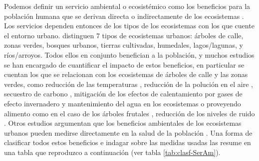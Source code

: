 \documentclass[12pt,]{book}
\begin{document}
Podemos definir un servicio ambiental o ecosistémico como los beneficios
para la población humana que se derivan directa o indirectamente de los
ecosistemas \citep{bolund_ecosystem_1999}. Los servicios dependen
entonces de los tipos de los ecosistemas con los que cuente el entorno
urbano. \citet{bolund_ecosystem_1999} distinguen 7 tipos de ecosistemas
urbanos: árboles de calle, zonas verdes, bosques urbanos, tierras
cultivadas, humedales, lagos/lagunas, y ríos/arroyos. Todos ellos en
conjunto benefician a la población, y muchos estudios se han encargado
de cuantificar el impacto de estos beneficios, en particular se cuentan
los que se relacionan con los ecosistemas de árboles de calle y las
zonas verdes, como reducción de las temperaturas
\citep{ripoll_condiciones_2010}, reducción de la polución en el aire
\citep{duran_rivera_intercepcion_2009}, secuestro de carbono
\citep{nowak_carbon_2002, mcpherson2013new} , mitigación de los efectos
de calentamiento por gases de efecto invernadero
\citep{laredo_gestion_2011} y mantenimiento del agua en los ecosistemas
o proveyendo alimento como en el caso de los árboles frutales
\citep{konijnendijk_arboles_2005, nolazco_diversidad_2012}, reducción de
los niveles de ruido \citep{bolund_ecosystem_1999}. Otros estudios
argumentan que los beneficios ambientales de los ecosistemas urbanos
pueden medirse directamente en la salud de la población
\citep{bolund_ecosystem_1999, gomez-baggethun_classifying_2013}. Una
forma de clasificar todos estos beneficios e indagar sobre las medidas
usadas las resume \citet{gomez-baggethun_classifying_2013} en una tabla
que reproduzco a continuación (ver tabla \ref{tab:clasf-SerAm}).
\end{document}
